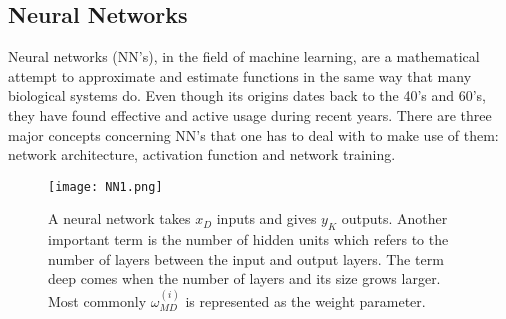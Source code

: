 \subsection{Neural Networks} \label{sec:NNs}
Neural networks (NN's), in the field of machine learning, are a mathematical attempt to approximate and estimate functions in the same way that many biological systems do. Even though its origins dates back to the 40's and 60's, they have found effective and active usage during recent years. There are three major concepts concerning NN's that one has to deal with to make use of them:  network architecture, activation function and network training.
\begin{figure}[tb] 
\centering 
\texttt{[image: NN1.png]} 
\caption[Neural network example architecture]{A neural network takes $x_D$ inputs and gives $y_K$ outputs. Another important term is the number of hidden units which refers to the number of layers between the input and output layers. The term deep comes when the number of layers and its size grows larger. Most commonly $\omega_{MD}^{(i)}$ is represented as the weight parameter.}
\label{fig:NNim1} 
\end{figure} 
